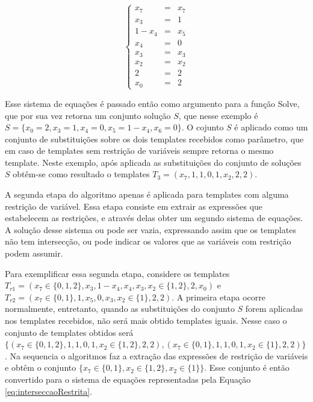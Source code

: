 \documentclass[12pt,a4paper]{article}
\begin{document}
	\begin{equation}
	\left\{\begin{matrix}
	x_7   & = & x_7 \\ 
	x_3   & = & 1 \\ 
	1-x_4 & = & x_5    \\ 
	x_4   & = & 0    \\ 
	x_3   & = & x_3    \\ 
	x_2   & = & x_2   \\ 
	2     & = & 2   \\ 
	x_0   & = & 2
	\end{matrix}\right.
	\label{eq:interseccao}
	\end{equation}

	Esse sistema de equações é passado então como argumento para a função Solve, que por sua vez retorna um conjunto solução $S$, que nesse exemplo é $S = \{x_0 = 2, x_3 = 1, x_4 = 0, x_5 = 1 - x_4, x_6 = 0\}$. O cojunto $S$ é aplicado como um conjunto de substituições sobre os dois templates recebidos como parâmetro, que em caso de templates sem restrição de variáveis sempre retorna o mesmo template. Neste exemplo, após aplicada as substituições do conjunto de soluções $S$ obtêm-se como resultado o templates $T_3 = (x_7, 1, 1, 0, 1, x_2, 2, 2)$.

	A segunda etapa do algoritmo apenas é aplicada para templates com alguma restrição de variável. Essa etapa consiste em extrair as expressões que estabelecem as restrições, e através delas obter um segundo sistema de equações. A solução desse sistema ou pode ser vazia, expressando assim que os templates não tem intersecção, ou pode indicar os valores que as variáveis com restrição podem assumir.

	Para exemplificar essa segunda etapa, considere os templates $T_{r1} = (x_7 \in \{0,1,2\},x_3,1-x_4,x_4,x_3,x_2 \in \{1,2\},2,x_0)$ e $T_{r2} = (x_7 \in \{0,1\},1,x_5,0,x_3,x_2 \in \{1\},2,2)$. A primeira etapa ocorre normalmente, entretanto, quando as substituições do conjunto $S$ forem aplicadas nos templates recebidos, não será mais obtido templates iguais. Nesse caso o conjunto de templates obtidos será $\{(x_7 \in \{0,1,2\}, 1, 1, 0, 1, x_2 \in \{1,2\}, 2, 2), (x_7 \in \{0,1\}, 1, 1, 0, 1, x_2 \in \{1\}, 2, 2)\}$. Na sequencia o algoritmos faz a extração das expressões de restrição de variáveis e obtêm o conjunto $\{x_7 \in \{0,1\}, x_2 \in \{1,2\}, x_2 \in \{1\} \}$. Esse conjunto é então convertido para o sistema de equações representadas pela Equação \ref{eq:interseccaoRestrita}.
\end{document}
